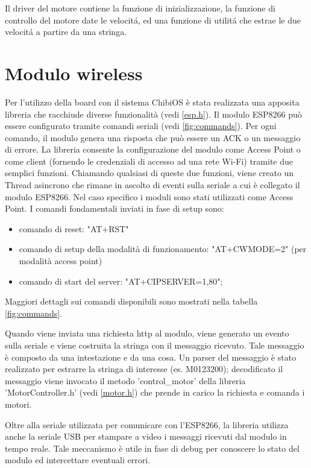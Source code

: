 \documentclass [11pt ,a4paper]{report}
\begin{document}
Il driver del motore contiene la funzione di inizializzazione, la funzione di controllo del motore date le velocit\'a, ed una funzione di utilit\'a che estrae le due velocit\'a a partire da una stringa.


\section{Modulo wireless}

 Per l'utilizzo della board con il sistema ChibiOS \`e stata realizzata una apposita libreria che racchiude diverse funzionalit\`a (vedi \ref{esp.h}). Il modulo ESP8266 pu\`o essere configurato tramite comandi seriali (vedi \ref{fig:commands}). Per ogni comando, il modulo genera una risposta che pu\`o essere un ACK o un messaggio di errore.
La libreria consente la configurazione del modulo come Access Point o come client (fornendo le credenziali di accesso ad una rete Wi-Fi) tramite due semplici funzioni. Chiamando qualsiasi di queste due funzioni, viene creato un Thread asincrono che rimane in ascolto di eventi sulla seriale a cui \`e collegato il modulo ESP8266. Nel caso specifico i moduli sono stati utilizzati come Access Point.
I comandi fondamentali inviati in fase di setup sono:
\begin{itemize}
	\item comando di reset: "AT+RST"
	\item comando di setup della modalit\`a di funzionamento: "AT+CWMODE=2" (per modalit\`a access point)
	\item comando di start del server:  "AT+CIPSERVER=1,80";
\end{itemize}
Maggiori dettagli sui comandi disponibili sono mostrati nella tabella \ref{fig:commands}.
\par Quando viene inviata una richiesta http al modulo, viene generato un evento sulla seriale e viene costruita la stringa con il messaggio ricevuto. Tale messaggio \`e composto da una intestazione e da una cosa. Un parser del messaggio \`e stato realizzato per estrarre la stringa di interesse (es. M0123200); decodificato il messaggio viene invocato il metodo 'control\_motor' della libreria 'MotorController.h' (vedi \ref{motor.h}) che prende in carico la richiesta e comanda i motori.
\par Oltre alla seriale utilizzata per comunicare con l'ESP8266, la libreria utilizza anche la seriale USB per stampare a video i messaggi ricevuti dal modulo in tempo reale. Tale meccanismo \`e utile in fase di debug per conoscere lo stato del modulo ed intercettare eventuali errori. 
\end{document}
